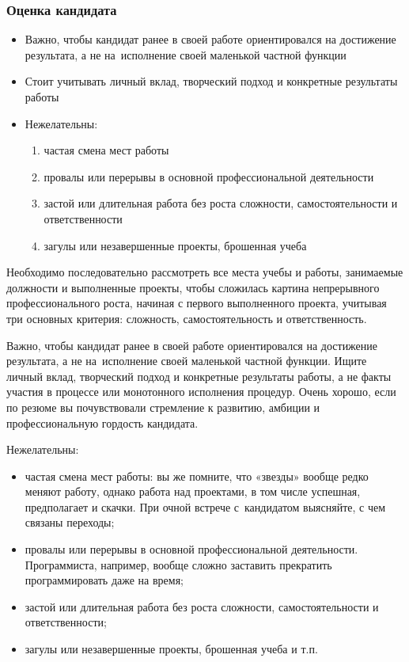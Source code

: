\documentclass{../industrial-development}
\begin{document}
\begin{frame} \frametitle{Оценка кандидата}
   \begin{itemize}

\item Важно, чтобы кандидат ранее в своей работе ориентировался на достижение результата, а не на~исполнение своей маленькой частной функции
\item Стоит учитывать личный вклад, творческий подход и конкретные результаты работы
\item Нежелательны:
  \begin{enumerate}
	\item частая смена мест работы
\item	провалы или перерывы в основной профессиональной деятельности
\item	застой или длительная работа без роста сложности, самостоятельности и ответственности
\item загулы или незавершенные проекты, брошенная учеба

	  \end{enumerate}
			  \end{itemize}

\end{frame}

\lecturenotes

Необходимо последовательно рассмотреть все места учебы и работы, занимаемые должности и выполненные проекты, чтобы сложилась картина непрерывного профессионального роста, начиная с первого выполненного проекта, учитывая три основных критерия: сложность, самостоятельность и ответственность.

Важно, чтобы кандидат ранее в своей работе ориентировался на достижение результата, а не на~исполнение своей маленькой частной функции. Ищите личный вклад, творческий подход и конкретные результаты работы, а не факты участия в процессе или монотонного исполнения процедур. Очень хорошо, если по резюме вы почувствовали стремление к развитию, амбиции и профессиональную гордость кандидата.

Нежелательны:
 \begin{itemize}
\item	частая смена мест работы: вы же помните, что «звезды» вообще редко меняют работу, однако работа над проектами, в том числе успешная, предполагает и скачки. При очной встрече с~кандидатом выясняйте, с чем связаны переходы;

\item	провалы или перерывы в основной профессиональной деятельности. Программиста, например, вообще сложно заставить прекратить программировать даже на время;

\item	застой или длительная работа без роста сложности, самостоятельности и ответственности;

\item	загулы или незавершенные проекты, брошенная учеба и т.п.
 \end{itemize}
\end{document}
